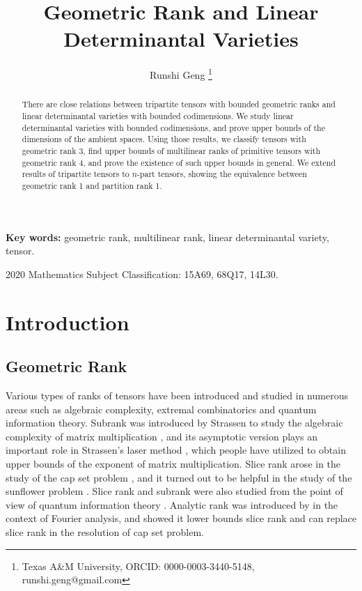 \documentclass[10pt]{article} %
\title{Geometric Rank and Linear Determinantal Varieties}
\author{Runshi Geng
\footnote{Texas A\&M University, ORCID: 0000-0003-3440-5148, runshi.geng@gmail.com}}
\theoremstyle{definition}
\begin{document}
\maketitle
\begin{abstract}
There are close relations between tripartite tensors with bounded geometric ranks and linear determinantal varieties with bounded codimensions. We study linear determinantal varieties with bounded codimensions, and prove upper bounds of the dimensions of the ambient spaces. Using those results, we classify tensors with geometric rank 3, find upper bounds of multilinear ranks of primitive tensors with geometric rank 4, and prove the existence of such upper bounds in general. We extend results of tripartite tensors to $n$-part tensors, showing the equivalence between geometric rank 1 and partition rank 1.
\end{abstract}

\vspace{-0.3em}\hspace*{2.5em}\textbf{Key words:} geometric rank, multilinear rank, linear determinantal variety, tensor.

\vspace{-0.3em}\hspace*{2.5em}2020 Mathematics Subject Classification: 15A69, 68Q17, 14L30.

\section{Introduction}
\subsection{Geometric Rank}
Various types of ranks of tensors have been introduced and studied in numerous areas such as algebraic complexity, extremal combinatorics and quantum information theory. Subrank was introduced by Strassen to study the algebraic complexity of matrix multiplication \cite{str}, and its asymptotic version plays an important role in Strassen's laser method \cite{str87}, which people have utilized to obtain upper bounds of the exponent of matrix multiplication. Slice rank arose in the study of the cap set problem \cite{slice}, and it turned out to be helpful in the study of the sunflower problem \cite{naslund2017upper}. Slice rank and subrank were also studied from the point of view of quantum information theory \cite{universal}. Analytic rank was introduced by \cite{analytic} in the context of Fourier analysis, and \cite{analytic2} showed it lower bounds slice rank and can replace slice rank in the resolution of cap set problem.
\end{document}
